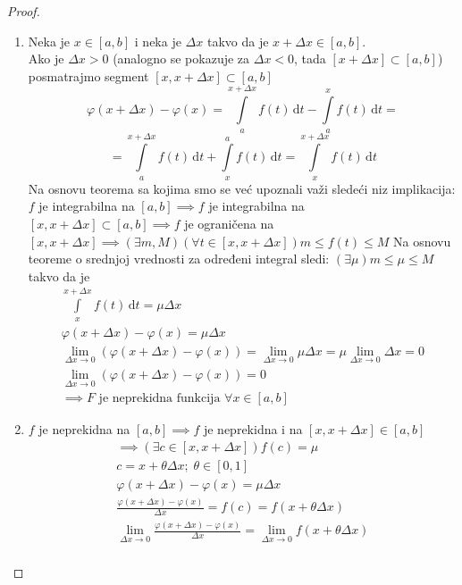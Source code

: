 \begin{proof}
	\begin{enumerate}[label = \arabic*)]
		\item
			Neka je $x\in [a,b]$ i neka je $\Delta x$ takvo da je $x+\Delta x \in [a,b]$.\\
			Ako je $\Delta x > 0$ (analogno se pokazuje za $\Delta x <0$, tada $[x+\Delta x] \subset [a,b]$) posmatrajmo segment $[x,x+\Delta x]\subset [a,b]$
			$$\varphi(x+\Delta x) - \varphi(x) = \int \limits^{x+\Delta x}_a f(t) \, \mathrm{d}t - \int \limits^x_a f(t) \, \mathrm{d}t=$$
			$$= \int \limits^{x+\Delta x}_a f(t) \, \mathrm{d}t + \int \limits^a_x f(t) \, \mathrm{d}t=\int \limits^{x+\Delta x}_x f(t) \, \mathrm{d}t$$
			Na osnovu teorema sa kojima smo se već upoznali važi sledeći niz implikacija:\\
			$f$ je integrabilna na $[a,b] \implies f$ je integrabilna na $[x,x+\Delta x]\subset[a,b] \implies f$ je ograničena na $[x,x+\Delta x] \implies (\exists m, M)(\forall t \in [x, x+\Delta x]) m\leq f(t) \leq M$ Na osnovu teoreme o srednjoj vrednosti za određeni integral sledi: $(\exists \mu) m\leq \mu \leq M$ takvo da je 
			\begin{gather*}
				\int \limits^{x+\Delta x}_x f(t) \, \mathrm{d}t = \mu \Delta x\\
				\varphi(x+\Delta x)- \varphi(x) = \mu \Delta x\\
				 \lim_{\Delta x \to 0} (\varphi(x+\Delta x)-\varphi(x)) = \lim_{\Delta x \to 0} \mu \Delta x = \mu \lim_{\Delta x \to 0}\Delta x = 0\\
				\lim_{\Delta x \to 0} (\varphi(x+\Delta x)-\varphi(x)) = 0\\
				\implies F \text{ je neprekidna funkcija } \forall x \in [a,b]
			\end{gather*}		
		\item 
			$f$ je neprekidna na $[a,b] \implies f$ je neprekidna i na $[x, x+\Delta x] \in [a,b]$
			\begin{gather*}
				\implies ( \exists c \in [x, x+ \Delta x]) f(c) = \mu \\
				c = x+\theta \Delta x; \; \theta \in [0,1]\\
				\varphi(x+\Delta x)-\varphi(x) = \mu \Delta x\\
				\frac{\varphi(x+\Delta x)-\varphi(x)}{\Delta x} = f(c) = f(x+ \theta \Delta x)\\
				\lim_{\Delta x \to 0}	\frac{\varphi(x+\Delta x)-\varphi(x)}{\Delta x} = \lim_{\Delta x \to 0} f(x+ \theta \Delta x)\\

\end{gather*}
\end{enumerate}
\end{proof}
